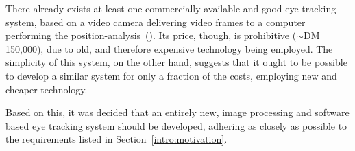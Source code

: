 There already exists at least one commercially available and good eye
tracking system, based on a video camera delivering video frames to a
computer performing the position-analysis~(\cite{antrag}).  Its price,
though, is prohibitive ($\sim$DM 150,000), due to old, and therefore
expensive technology being employed.  The simplicity of this system,
on the other hand, suggests that it ought to be possible to develop a
similar system for only a fraction of the costs, employing new and
cheaper technology.

Based on this, it was decided that an entirely new, image processing
and software based eye tracking system should be developed, adhering
as closely as possible to the requirements listed in
Section~\ref{intro:motivation}. 